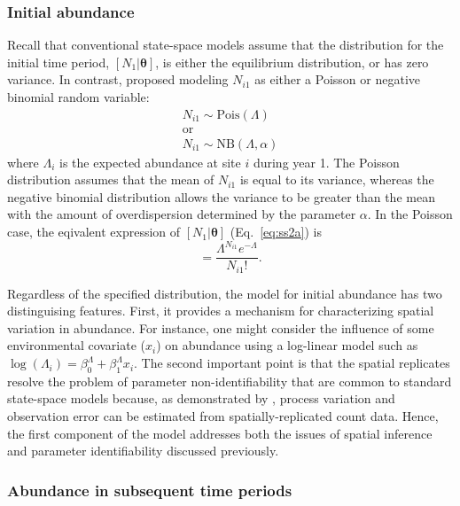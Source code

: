 \documentclass[12pt]{article}
\begin{document}
\subsubsection{Initial abundance}

Recall that conventional state-space models assume that the
distribution for the initial time period,
$[N_1 | \bm{\theta}]$, is either the equilibrium
distribution, or has zero variance.
In contrast, \citet{dail_madsen:2011} proposed modeling $N_{i1}$
as either a Poisson or negative binomial random variable:
\begin{gather}
N_{i1} \sim \mathrm{Pois}(\Lambda) \nonumber \\
\text{or} \nonumber \\
N_{i1} \sim \mathrm{NB}(\Lambda, \alpha)
\label{eq:N1}
\end{gather}
where $\Lambda_i$ is the expected abundance at site $i$ during year
1.
The Poisson distribution assumes that the mean of $N_{i1}$ is equal to its
variance, whereas the negative binomial distribution allows the
variance to be greater than the mean with the amount of overdispersion
determined by the parameter $\alpha$.
In the Poisson case, the eqivalent expression of
$[N_1 | \bm{\theta}]$ (Eq.~\ref{eq:ss2a}) is
\begin{equation}
  [N_{i1} | \Lambda] = \frac{\Lambda^{N_{i1}}e^{-\Lambda}}{N_{i1}!}.
  \label{eq:N1br}
\end{equation}

Regardless of the specified distribution, the model for initial
abundance has two distinguising features. First, it provides a
mechanism for characterizing spatial variation in abundance. For
instance, one might consider the influence of some environmental
covariate ($x_i$) on abundance using a log-linear
model such as $\log(\Lambda_i) = \beta^{\Lambda}_0 + \beta^{\Lambda}_1
x_{i}$. The second important point is that the spatial replicates resolve the
problem of parameter non-identifiability that are common to standard
state-space models because, as demonstrated by \citet{royle:2004biom},
process variation and observation error can be estimated from
spatially-replicated count data. Hence, the first component of the
model addresses both the issues of spatial inference and parameter
identifiability discussed previously.

\subsubsection{Abundance in subsequent time periods}
\end{document}
